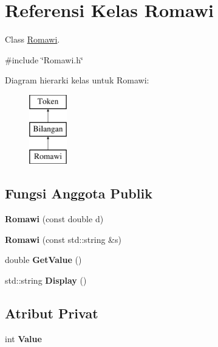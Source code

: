 \hypertarget{classRomawi}{}\section{Referensi Kelas Romawi}
\label{classRomawi}


Class \hyperlink{classRomawi}{Romawi}.  




{\ttfamily \#include \char`\"{}Romawi.\+h\char`\"{}}

Diagram hierarki kelas untuk Romawi\+:\begin{figure}[H]
\begin{center}
\leavevmode
\includegraphics[height=3.000000cm]{d9/de3/classRomawi}
\end{center}
\end{figure}
\subsection*{Fungsi Anggota Publik}
\begin{DoxyCompactItemize}
\item 
\hypertarget{classRomawi_ad246367c51d3d67d4fbaaee36031ccd1}{}{\bfseries Romawi} (const double d)\label{classRomawi_ad246367c51d3d67d4fbaaee36031ccd1}

\item 
\hypertarget{classRomawi_a46332c134c2f38feb7787994bd99e3ad}{}{\bfseries Romawi} (const std\+::string \&s)\label{classRomawi_a46332c134c2f38feb7787994bd99e3ad}

\item 
\hypertarget{classRomawi_adc5a0a8e2ad13902f66da32e5ebe2bfe}{}double {\bfseries Get\+Value} ()\label{classRomawi_adc5a0a8e2ad13902f66da32e5ebe2bfe}

\item 
\hypertarget{classRomawi_a630b1a4635acfaa7a3def12b5a6aaecc}{}std\+::string {\bfseries Display} ()\label{classRomawi_a630b1a4635acfaa7a3def12b5a6aaecc}

\end{DoxyCompactItemize}
\subsection*{Atribut Privat}
\begin{DoxyCompactItemize}
\item 
\hypertarget{classRomawi_a3e4b59813abe2887a88258ac316e27d9}{}int {\bfseries Value}\label{classRomawi_a3e4b59813abe2887a88258ac316e27d9}

\end{DoxyCompactItemize}


